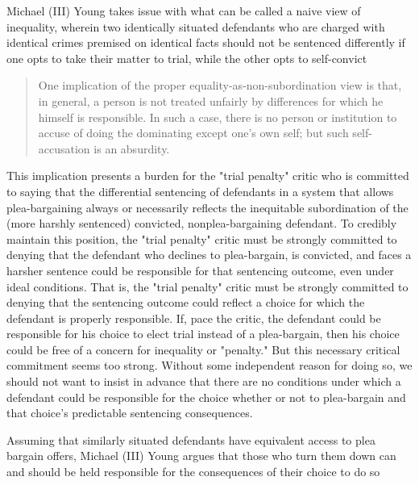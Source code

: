 Michael (III) Young takes issue with what can be called a naive view of inequality, wherein two identically situated defendants who are charged with identical crimes premised on identical facts should not be sentenced differently if one opts to take their matter to trial, while the other opts to self-convict

\begin{quote}
    One implication of the proper equality-as-non-subordination view is that, in general, a person is not treated unfairly by differences for which he himself is responsible. In such a case, there is no person or institution to accuse of doing the dominating except one's own self; but such self-accusation is an absurdity.
\end{quote}

This implication presents a burden for the "trial penalty" critic who is committed to saying that the differential sentencing of defendants in a system that allows plea-bargaining always or necessarily reflects the inequitable subordination of the (more harshly sentenced) convicted, nonplea-bargaining defendant. To credibly maintain this position, the "trial penalty" critic must be strongly committed to denying that the defendant who declines to plea-bargain, is convicted, and faces a harsher sentence could be responsible for that sentencing outcome, even under ideal conditions. That is, the "trial penalty" critic must be strongly committed to denying that the sentencing outcome could reflect a choice for which the defendant is properly responsible. If, pace the critic, the defendant could be responsible for his choice to elect trial instead of a plea-bargain, then his choice could be free of a concern for inequality or "penalty." But this necessary critical commitment seems too strong. Without some independent reason for doing so, we should not want to insist in advance that there are no conditions under which a defendant could be responsible for the choice whether or not to plea-bargain and that choice's predictable sentencing consequences.

Assuming that similarly situated defendants have equivalent access to plea bargain offers, Michael (III) Young argues that those who turn them down can and should be held responsible for the consequences of their choice to do so

